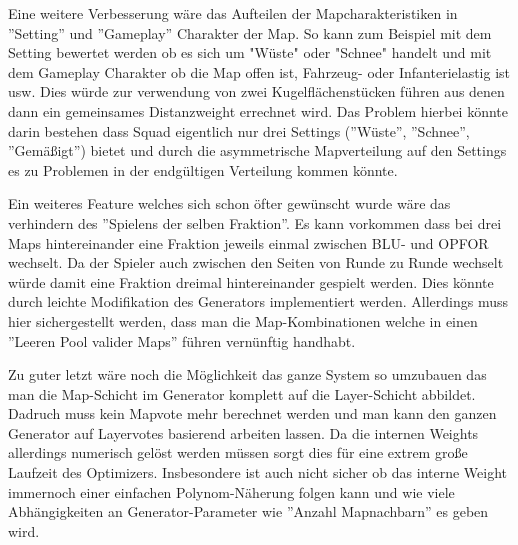         Eine weitere Verbesserung wäre das Aufteilen der Mapcharakteristiken in ''Setting'' und ''Gameplay'' Charakter der Map. 
        So kann zum Beispiel mit dem Setting bewertet werden ob es sich um "Wüste" oder "Schnee" handelt und mit dem Gameplay Charakter ob die Map offen ist, Fahrzeug- oder Infanterielastig ist usw. 
        Dies würde zur verwendung von zwei Kugelflächenstücken führen aus denen dann ein gemeinsames Distanzweight errechnet wird. 
        Das Problem hierbei könnte darin bestehen dass Squad eigentlich nur drei Settings (''Wüste'', ''Schnee'', ''Gemäßigt'') bietet und durch die asymmetrische Mapverteilung auf den Settings es zu Problemen in der endgültigen Verteilung kommen könnte.
        
        Ein weiteres Feature welches sich schon öfter gewünscht wurde wäre das verhindern des ''Spielens der selben Fraktion''.
        Es kann vorkommen dass bei drei Maps hintereinander eine Fraktion jeweils einmal zwischen BLU- und OPFOR wechselt. 
        Da der Spieler auch zwischen den Seiten von Runde zu Runde wechselt würde damit eine Fraktion dreimal hintereinander gespielt werden.
        Dies könnte durch leichte Modifikation des Generators implementiert werden. 
        Allerdings muss hier sichergestellt werden, dass man die Map-Kombinationen welche in einen ''Leeren Pool valider Maps'' führen vernünftig handhabt.
        
        Zu guter letzt wäre noch die Möglichkeit das ganze System so umzubauen das man die Map-Schicht im Generator komplett auf die Layer-Schicht abbildet.
        Dadruch muss kein Mapvote mehr berechnet werden und man kann den ganzen Generator auf Layervotes basierend arbeiten lassen.
        Da die internen Weights allerdings numerisch gelöst werden müssen sorgt dies für eine extrem große Laufzeit des Optimizers.
        Insbesondere ist auch nicht sicher ob das interne Weight immernoch einer einfachen Polynom-Näherung folgen kann und wie viele Abhängigkeiten an Generator-Parameter wie ''Anzahl Mapnachbarn'' es geben wird. 
